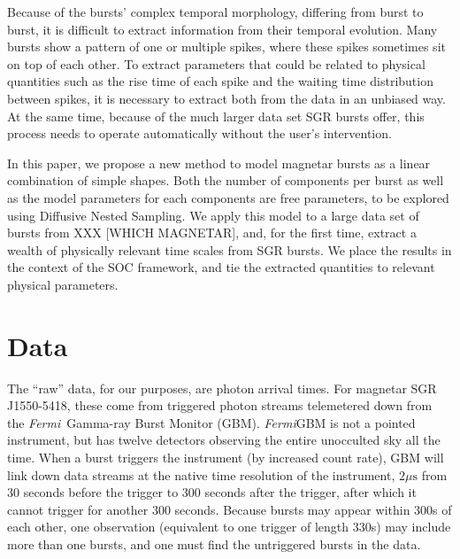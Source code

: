 \documentclass[12pt]{emulateapj}
\newcommand{\project}[1]{\textsl{#1}}
\newcommand{\Fermi}{\project{Fermi}}
\begin{document}

Because of the bursts' complex temporal morphology, differing from burst to burst, it is difficult to extract information from their temporal evolution. 
Many bursts show a pattern of one or multiple spikes, where these spikes sometimes sit on top of each other. To extract parameters that could be related
to physical quantities such as the rise time of each spike and the waiting time distribution between spikes, it is necessary to 
extract both from the data in an unbiased way. At the same time, because of the much larger data set SGR bursts offer, this process
needs to operate automatically without the user's intervention.

In this paper, we propose a new method to model magnetar bursts as a linear combination of simple shapes. Both the number of components
per burst as well as the model parameters for each components are free parameters, to be explored using Diffusive Nested Sampling.
We apply this model to a large data set of bursts from XXX [WHICH MAGNETAR], and, for the first time, extract a wealth of 
physically relevant time scales from SGR bursts. We place the results in the context of the SOC framework, and tie the extracted
quantities to relevant physical parameters.


\section{Data}

The ``raw'' data, for our purposes, are photon arrival times.
For magnetar SGR J1550-5418, these come from triggered photon streams telemetered down from the \Fermi\ Gamma-ray Burst Monitor (GBM).
\Fermi\/GBM is not a pointed instrument, but has twelve detectors observing the entire unocculted sky all the time. When a burst triggers the
instrument (by increased count rate), GBM will link down data streams at the native time resolution of the instrument, $2\mu\mathrm{s}$ from 
$30$ seconds before the trigger to $300$ seconds after the trigger, after which it cannot trigger for another $300$ seconds. 
Because bursts may appear within $300$s of each other, one observation (equivalent to one trigger of length $330$s) may include more than one
bursts, and one must find the untriggered bursts in the data.
\end{document}
